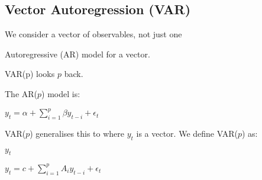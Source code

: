 
\subsection{Vector Autoregression (VAR)}

We consider a vector of observables, not just one

Autoregressive (AR) model for a vector.

VAR(p) looks \(p\) back.

The AR(\(p\)) model is:

\(y_t=\alpha + \sum_{i=1}^p\beta y_{t-i}+\epsilon_t\)

VAR(\(p\)) generalises this to where \(y_t\) is a vector. We define VAR(\(p\)) as:

\(y_t\)

\(y_t=c + \sum_{i=1}^pA_i y_{t-i}+\epsilon_t\)

